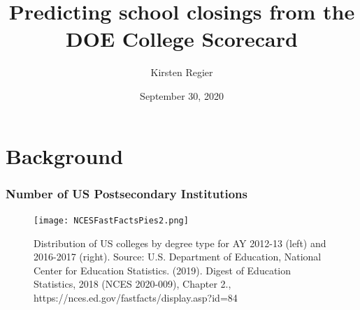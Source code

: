 \documentclass{beamer}
\title[College Scorecard]{Predicting school closings from the DOE College Scorecard} %
\author{Kirsten Regier} %
\date{September 30, 2020} %
\begin{document}
\begin{frame}
\titlepage %
\end{frame}


\section{Background} %
\begin{frame}
\frametitle{Number of US Postsecondary Institutions}

\begin{figure}
\begin{center}
\texttt{[image: NCESFastFactsPies2.png]}
\caption{Distribution of US colleges by degree type for AY 2012-13 (left) and 2016-2017 (right).  \newline
\tiny{Source: U.S. Department of Education, National Center for Education Statistics. (2019). Digest of Education Statistics, 2018 (NCES 2020-009), Chapter 2., https://nces.ed.gov/fastfacts/display.asp?id=84}}
\end{center}
\end{figure}

\end{frame}
\end{document}
